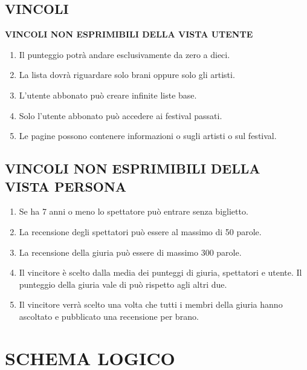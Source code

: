 \documentclass{article}
\begin{document}
\newpage

\subsection{VINCOLI}

\noindent \textbf{VINCOLI NON ESPRIMIBILI DELLA VISTA UTENTE}
\begin{enumerate}
    \item Il punteggio potrà andare esclusivamente da zero a dieci.
    \item La lista dovrà riguardare solo brani oppure solo gli artisti.
    \item L'utente abbonato può creare infinite liste base.
    \item Solo l'utente abbonato può accedere ai festival passati.
    \item Le pagine possono contenere informazioni o sugli artisti o sul festival.
\end{enumerate}
\subsection{VINCOLI NON ESPRIMIBILI DELLA VISTA PERSONA}
\begin{enumerate}
    \item Se ha 7 anni o meno lo spettatore può entrare senza biglietto.
    \item La recensione degli spettatori può essere al massimo di 50 parole.
    \item La recensione della giuria può essere di massimo 300 parole.
    \item Il vincitore è scelto dalla media dei punteggi di giuria, spettatori e utente.
    Il punteggio della giuria vale di può rispetto agli altri due.
    \item Il vincitore verrà scelto una volta che tutti i membri della giuria hanno ascoltato e pubblicato una recensione per brano.
\end{enumerate}

\newpage
\section{SCHEMA LOGICO}
\noindent
\end{document}
